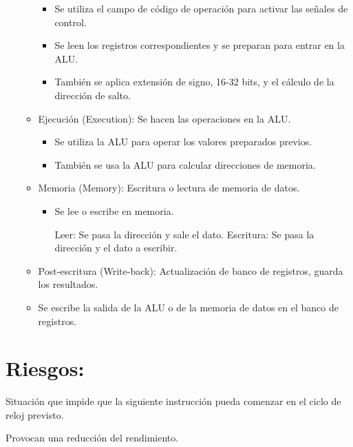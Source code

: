 \documentclass[12pt, twoside, openright]{report} %
\begin{document}
\begin{itemize}
\begin{itemize}
      \begin{itemize}
      
      \item
        Se utiliza el campo de código de operación para activar las
        señales de control.
      \item
        Se leen los registros correspondientes y se preparan para entrar
        en la ALU.
      \item
        También se aplica extensión de signo, 16-32 bits, y el cálculo
        de la dirección de salto.
      \end{itemize}
    \item
      Ejecución (Execution): Se hacen las operaciones en la ALU.

      \begin{itemize}
      
      \item
        Se utiliza la ALU para operar los valores preparados previos.
      \item
        También se usa la ALU para calcular direcciones de memoria.
      \end{itemize}
    \item
      Memoria (Memory): Escritura o lectura de memoria de datos.

      \begin{itemize}
      
      \item
        Se lee o escribe en memoria.

        
          Leer: Se pasa la dirección y sale el dato.
          Escritura: Se pasa la dirección y el dato a escribir.
      \end{itemize}
    \item
      Post-escritura (Write-back): Actualización de banco de registros,
      guarda los resultados.
    \item
      Se escribe la salida de la ALU o de la memoria de datos en el
      banco de registros.
    \end{itemize}
  \end{itemize}


  \section{Riesgos:}

Situación que impide que la siguiente instrucción pueda comenzar en el
ciclo de reloj previsto.

Provocan una reducción del rendimiento.
\end{document}
